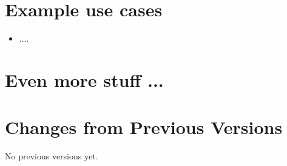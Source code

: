\documentclass[11pt,a4paper]{ivoa}
\begin{document}
\section{Example use cases}
\label{example-usecases}

\begin{itemize}
    \item ....
\end{itemize}

\section{Even more stuff ...}
\label{more-stuff}



\pagebreak
\appendix
\section{Changes from Previous Versions}

No previous versions yet.



\end{document}
